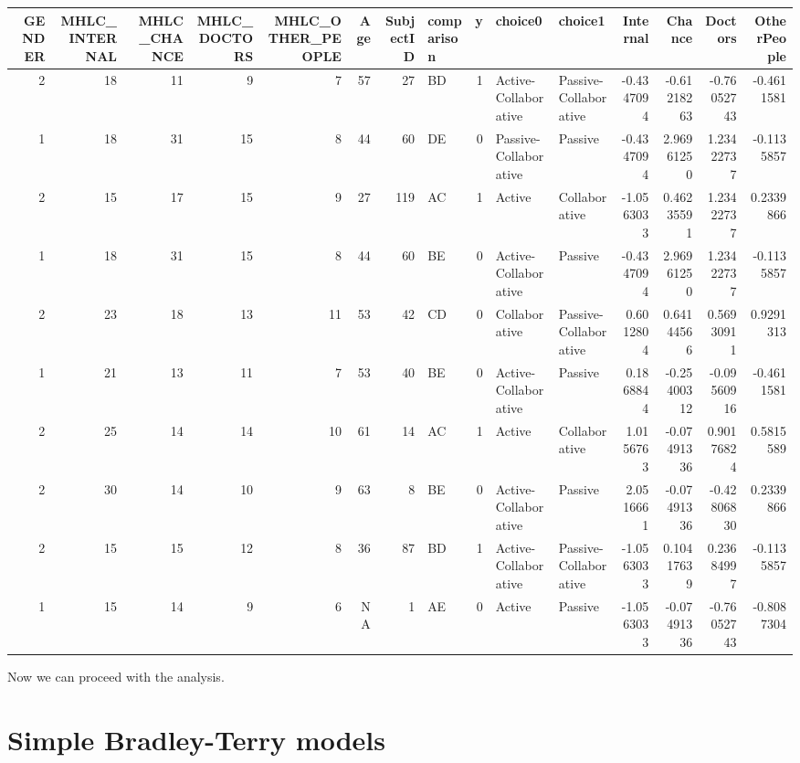\documentclass[
]{book}
\begin{document}
\begin{table}[H]
\centering
\begin{tabular}{r|r|r|r|r|r|r|l|r|l|l|r|r|r|r}
\hline
GENDER & MHLC\_INTERNAL & MHLC\_CHANCE & MHLC\_DOCTORS & MHLC\_OTHER\_PEOPLE & Age & SubjectID & comparison & y & choice0 & choice1 & Internal & Chance & Doctors & OtherPeople\\
\hline
2 & 18 & 11 & 9 & 7 & 57 & 27 & BD & 1 & Active-Collaborative & Passive-Collaborative & -0.4347094 & -0.61218263 & -0.76052743 & -0.4611581\\
\hline
1 & 18 & 31 & 15 & 8 & 44 & 60 & DE & 0 & Passive-Collaborative & Passive & -0.4347094 & 2.96961250 & 1.23422737 & -0.1135857\\
\hline
2 & 15 & 17 & 15 & 9 & 27 & 119 & AC & 1 & Active & Collaborative & -1.0563033 & 0.46235591 & 1.23422737 & 0.2339866\\
\hline
1 & 18 & 31 & 15 & 8 & 44 & 60 & BE & 0 & Active-Collaborative & Passive & -0.4347094 & 2.96961250 & 1.23422737 & -0.1135857\\
\hline
2 & 23 & 18 & 13 & 11 & 53 & 42 & CD & 0 & Collaborative & Passive-Collaborative & 0.6012804 & 0.64144566 & 0.56930911 & 0.9291313\\
\hline
1 & 21 & 13 & 11 & 7 & 53 & 40 & BE & 0 & Active-Collaborative & Passive & 0.1868844 & -0.25400312 & -0.09560916 & -0.4611581\\
\hline
2 & 25 & 14 & 14 & 10 & 61 & 14 & AC & 1 & Active & Collaborative & 1.0156763 & -0.07491336 & 0.90176824 & 0.5815589\\
\hline
2 & 30 & 14 & 10 & 9 & 63 & 8 & BE & 0 & Active-Collaborative & Passive & 2.0516661 & -0.07491336 & -0.42806830 & 0.2339866\\
\hline
2 & 15 & 15 & 12 & 8 & 36 & 87 & BD & 1 & Active-Collaborative & Passive-Collaborative & -1.0563033 & 0.10417639 & 0.23684997 & -0.1135857\\
\hline
1 & 15 & 14 & 9 & 6 & NA & 1 & AE & 0 & Active & Passive & -1.0563033 & -0.07491336 & -0.76052743 & -0.8087304\\
\hline
\end{tabular}
\end{table}

Now we can proceed with the analysis.

\hypertarget{simple-bradley-terry-models}{%
\section{Simple Bradley-Terry models}\label{simple-bradley-terry-models}}
\end{document}
